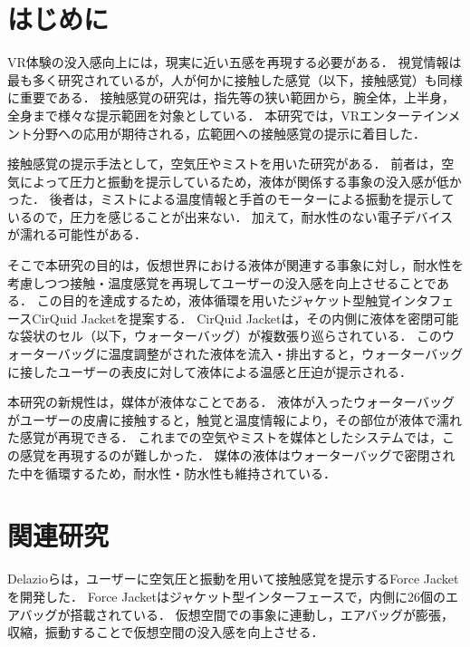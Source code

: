 \documentclass[uplatex]{jsarticle}   %
\begin{document}

\vspace{3mm}

\setcounter{page}{27}



\section{はじめに}
VR体験の没入感向上には，現実に近い五感を再現する必要がある．
視覚情報は最も多く研究されているが，人が何かに接触した感覚（以下，接触感覚）も同様に重要である．
接触感覚の研究は，指先等の狭い範囲から，腕全体，上半身，全身まで様々な提示範囲を対象としている．
本研究では，VRエンターテインメント分野への応用が期待される，広範囲への接触感覚の提示に着目した．

接触感覚の提示手法として，空気圧\cite{ty1}やミスト\cite{ty2}を用いた研究がある．
前者は，空気によって圧力と振動を提示しているため，液体が関係する事象の没入感が低かった．
後者は，ミストによる温度情報と手首のモーターによる振動を提示しているので，圧力を感じることが出来ない．
加えて，耐水性のない電子デバイスが濡れる可能性がある．

そこで本研究の目的は，仮想世界における液体が関連する事象に対し，耐水性を考慮しつつ接触・温度感覚を再現してユーザーの没入感を向上させることである．
この目的を達成するため，液体循環を用いたジャケット型触覚インタフェースCirQuid Jacketを提案する．
CirQuid Jacketは，その内側に液体を密閉可能な袋状のセル（以下，ウォーターバッグ）が複数張り巡らされている．
このウォーターバッグに温度調整がされた液体を流入・排出すると，ウォーターバッグに接したユーザーの表皮に対して液体による温感と圧迫が提示される．

本研究の新規性は，媒体が液体なことである．
液体が入ったウォーターバッグがユーザーの皮膚に接触すると，触覚と温度情報により，その部位が液体で濡れた感覚が再現できる．
これまでの空気やミストを媒体としたシステムでは，この感覚を再現するのが難しかった．
媒体の液体はウォーターバッグで密閉された中を循環するため，耐水性・防水性も維持されている．


\section{関連研究}
Delazioら\cite{ty1}は，ユーザーに空気圧と振動を用いて接触感覚を提示するForce Jacketを開発した．
Force Jacketはジャケット型インターフェースで，内側に26個のエアバッグが搭載されている．
仮想空間での事象に連動し，エアバッグが膨張，収縮，振動することで仮想空間の没入感を向上させる．
\end{document}
